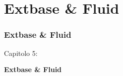 %

\section{Extbase \& Fluid}
\begin{frame}[fragile]
	\frametitle{Extbase \& Fluid}

	\begin{center}\huge{Capitolo 5:}\end{center}
	\begin{center}\huge{\color{typo3darkgrey}\textbf{Extbase \& Fluid}}\end{center}

\end{frame}


